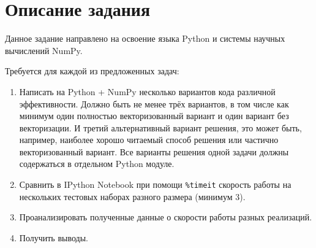 \documentclass{article}
\begin{document}
\fontsize{12pt}{14pt}\selectfont

\newcommand{\taskdesc}[0]{\paragraph{\large Постановка задачи}~\\}
\newcommand{\soldesc}[0]{\paragraph{\large Описание решений}~\\}
\newcommand{\testing}[0]{\paragraph{\large Сравнение времени работы}~\\}
\newcommand{\analysis}[0]{\paragraph{\large Анализ результатов и выводы}~\\}

\renewcommand{\arraystretch}{1.2}

\tableofcontents
\pagebreak

\setcounter{figure}{0}

\section{Описание задания}
\label{sec:desc}

Данное задание направлено на освоение языка Python и системы научных вычислений NumPy.

Требуется для каждой из предложенных задач:
\begin{enumerate}
    \item
    Написать на Python + NumPy несколько вариантов кода различной эффективности. Должно быть
    не менее трёх вариантов, в том числе как минимум один полностью векторизованный вариант и один
    вариант без векторизации. И третий альтернативный вариант решения, это может быть, например,
    наиболее хорошо читаемый способ решения или частично векторизованный вариант. Все варианты
    решения одной задачи должны содержаться в отдельном Python модуле.
    \item
    Сравнить в IPython Notebook при помощи \verb"%timeit" скорость работы на нескольких тестовых наборах
    разного размера (минимум 3).
    \item
    Проанализировать полученные данные о скорости работы разных реализаций.
    \item 
    Получить выводы.
\end{enumerate}
\end{document}
